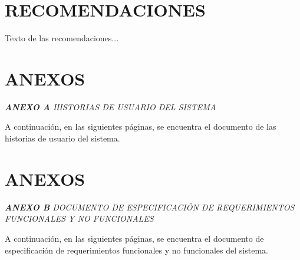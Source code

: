 \documentclass[spanish]{ieee_upb}
\begin{document}
\section{RECOMENDACIONES}
Texto de las recomendaciones...

\newpage
\renewcommand\refname{REFERENCIAS}



\newpage


\appendix
\section{ANEXOS}
\raggedright\textit{\textbf{ANEXO A} HISTORIAS DE USUARIO DEL SISTEMA}
\label{anexos:historias}

A continuación, en las siguientes páginas, se encuentra el documento de las historias de usuario del sistema. 





\newpage

\section{ANEXOS}
\raggedright\textit{\textbf{ANEXO B} DOCUMENTO DE ESPECIFICACIÓN DE REQUERIMIENTOS FUNCIONALES Y NO FUNCIONALES}
\label{anexos:requerimientos}

A continuación, en las siguientes páginas, se encuentra el documento de especificación de requerimientos funcionales y no funcionales del sistema.


\end{document}
